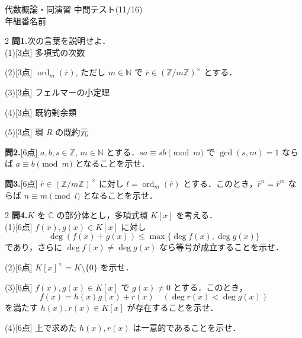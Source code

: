 \documentclass[a4paper,11pt]{jsarticle}
\newcommand{\testheader}{
\begin{center}
{\large 代数概論・同演習 中間テスト(11/16)}\\[1em]
\underline{\hspace{1cm}}年\underline{\hspace{1cm}}組\underline{\hspace{1cm}}番\hspace{0.5cm}名前\underline{\hspace{6cm}}
\end{center}
}
\begin{document}
\testheader

\begin{multicols*}{2}
\noindent
\textbf{問1.}\quad 次の言葉を説明せよ．\\[0.5em]
(1)[3点] 多項式の次数
\vspace{4cm}

\noindent
(2)[3点] $\operatorname{ord}_m(\bar{r})$, ただし $m \in \mathbb{N}$ で $\bar{r} \in (\mathbb{Z}/m\mathbb{Z})^{\times}$ とする．
\vspace{4cm}

\noindent
(3)[3点] フェルマーの小定理
\vspace{4cm}

\noindent
(4)[3点] 既約剰余類
\vspace{4cm}

\noindent
(5)[3点] 環 $R$ の既約元
\vspace{4cm}

\vfill\null
\columnbreak

\noindent
\textbf{問2.}[6点] $a, b, s \in \mathbb{Z}$, $m \in \mathbb{N}$ とする．$sa \equiv sb \pmod m$ で $\gcd(s, m) = 1$ ならば $a \equiv b \pmod m$ となることを示せ．
\vspace{11cm}

\noindent
\textbf{問3.}[6点] $\bar{r} \in (\mathbb{Z}/m\mathbb{Z})^{\times}$ に対し $l = \operatorname{ord}_m(\bar{r})$ とする．このとき，$\bar{r}^n = \bar{r}^m$ ならば $n \equiv m \pmod l$ となることを示せ．
\vspace{11cm}

\vfill\null
\end{multicols*}

\newpage

\begin{multicols*}{2}
\noindent
\textbf{問4.}\quad $K$ を $\mathbb{C}$ の部分体とし，多項式環 $K[x]$ を考える．\\
(1)[6点] $f(x), g(x) \in K[x]$ に対し
\[ \deg(f(x) + g(x)) \le \max\{\deg f(x), \deg g(x)\} \]
であり，さらに $\deg f(x) \ne \deg g(x)$ なら等号が成立することを示せ．
\vspace{10cm}

\noindent
(2)[6点] $K[x]^{\times} = K \setminus \{0\}$ を示せ．
\vspace{10cm}

\vfill\null
\columnbreak

\noindent
(3)[6点] $f(x), g(x) \in K[x]$ で $g(x) \ne 0$ とする．このとき，
\[ f(x) = h(x)g(x) + r(x) \quad (\deg r(x) < \deg g(x)) \]
を満たす $h(x), r(x) \in K[x]$ が存在することを示せ．
\vspace{14cm}

\noindent
(4)[6点] 上で求めた $h(x), r(x)$ は一意的であることを示せ．

\vfill\null
\end{multicols*}
\end{document}
